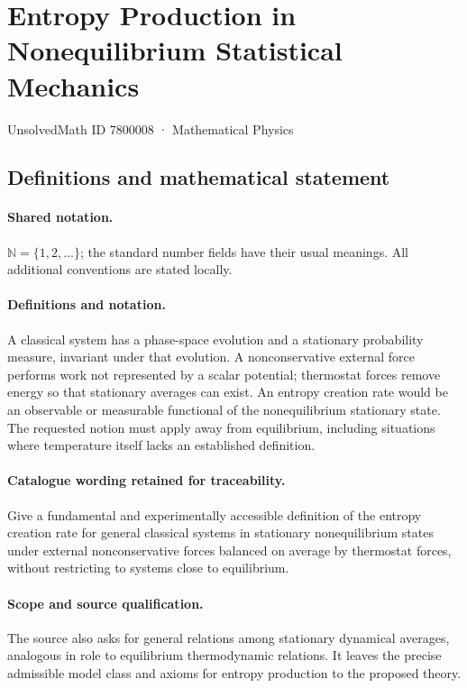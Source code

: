 \documentclass[11pt]{article}
\begin{document}
\setcounter{section}{7800007}
\section{Entropy Production in Nonequilibrium Statistical Mechanics}\label{7800008}
{\small UnsolvedMath ID 7800008 · Mathematical Physics}
\subsection{Definitions and mathematical statement}

\paragraph{Shared notation.}$\mathbb N=\{1,2,\ldots\}$; the standard number fields have their usual meanings. All additional conventions are stated locally.


\paragraph{Definitions and notation.}A classical system has a phase-space evolution and a stationary probability measure, invariant under that evolution. A nonconservative external force performs work not represented by a scalar potential; thermostat forces remove energy so that stationary averages can exist. An entropy creation rate would be an observable or measurable functional of the nonequilibrium stationary state. The requested notion must apply away from equilibrium, including situations where temperature itself lacks an established definition.

\paragraph{Catalogue wording retained for traceability.}
Give a fundamental and experimentally accessible definition of the entropy creation rate for general classical systems in stationary nonequilibrium states under external nonconservative forces balanced on average by thermostat forces, without restricting to systems close to equilibrium.
\paragraph{Scope and source qualification.}The source also asks for general relations among stationary dynamical averages, analogous in role to equilibrium thermodynamic relations. It leaves the precise admissible model class and axioms for entropy production to the proposed theory.
\end{document}

